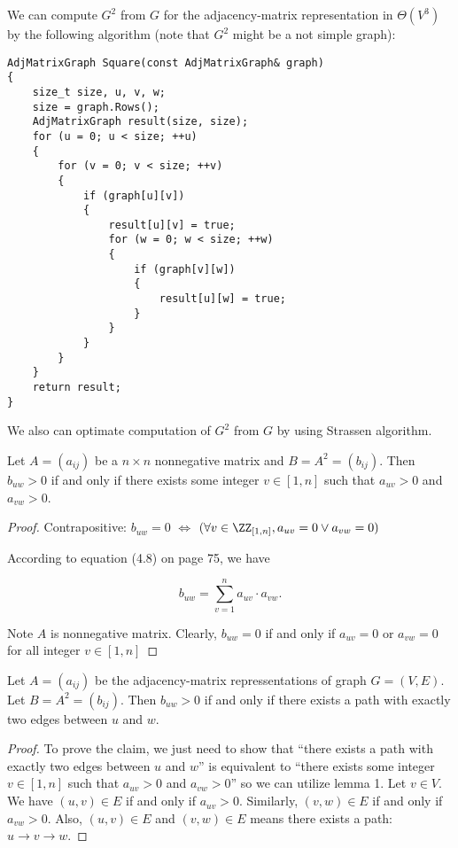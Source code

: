 We can compute $G^2$ from $G$ 
for the adjacency-matrix representation in $\Theta(V^3)$
by the following algorithm
(note that $G^2$ might be a not simple graph):
    
\begin{verbatim}
AdjMatrixGraph Square(const AdjMatrixGraph& graph)
{
    size_t size, u, v, w;
    size = graph.Rows();
    AdjMatrixGraph result(size, size);
    for (u = 0; u < size; ++u)
    {
        for (v = 0; v < size; ++v)
        {
            if (graph[u][v])
            {
                result[u][v] = true;
                for (w = 0; w < size; ++w)
                {
                    if (graph[v][w])
                    {
                        result[u][w] = true;
                    }
                }
            }
        }
    }
    return result;
}
\end{verbatim}

We also can optimate computation of $G^2$ from $G$
by using Strassen algorithm.

\begin{lemma}
    Let $A=(a_{ij})$ be a $n \times n$ nonnegative matrix and $B=A^2=(b_{ij})$.
    Then $b_{uw} > 0$ if and only if 
    there exists some integer $v \in [1,n]$ such that $a_{uv} > 0$ and $a_{vw} > 0$.
\end{lemma}

\begin{proof}
    Contrapositive: 
    $b_{uw} = 0$ 
    $\Longleftrightarrow$
    $(\forall v \in \ZZ_{[1,n]}, a_{uv} = 0 \vee a_{vw} = 0)$

    According to equation (4.8) on page 75, we have

    \begin{equation*}
        b_{uw} = \sum\limits_{v=1}^{n} a_{uv} \cdot a_{vw}.
    \end{equation*}

    Note $A$ is nonnegative matrix.
    Clearly, $b_{uw} = 0$ if and only if
    $a_{uv}=0$ or $a_{vw}=0$ for all integer $v \in [1,n]$
\end{proof}

\begin{claim}
    Let $A=(a_{ij})$ be the adjacency-matrix repressentations of graph $G=(V,E)$.
    Let $B = A^2=(b_{ij})$.
    Then $b_{uw} > 0$ if and only if 
    there exists a path with exactly two edges between $u$ and $w$.
\end{claim}

\begin{proof}
    To prove the claim, we just need to show that 
    ``there exists a path with exactly two edges between $u$ and $w$''
    is equivalent to
    ``there exists some integer $v \in [1,n]$ such that $a_{uv} > 0$ and $a_{vw} > 0$''
    so we can utilize lemma 1.
    Let $v \in V$.
    We have $(u,v) \in E$ if and only if $a_{uv} > 0$.
    Similarly, $(v,w) \in E$ if and only if $a_{vw} > 0$.
    Also, $(u,v) \in E$ and $(v,w) \in E$ means
    there exists a path: $u \rightarrow v \rightarrow w$.
\end{proof}

